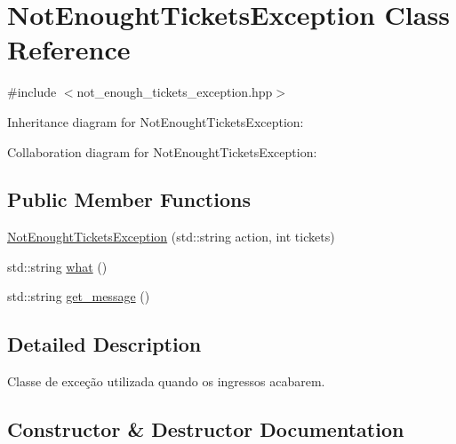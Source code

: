 \hypertarget{class_not_enought_tickets_exception}{}\section{Not\+Enought\+Tickets\+Exception Class Reference}
\label{class_not_enought_tickets_exception}


{\ttfamily \#include $<$not\+\_\+enough\+\_\+tickets\+\_\+exception.\+hpp$>$}



Inheritance diagram for Not\+Enought\+Tickets\+Exception\+:


Collaboration diagram for Not\+Enought\+Tickets\+Exception\+:
\subsection*{Public Member Functions}
\begin{DoxyCompactItemize}
\item 
\hyperlink{class_not_enought_tickets_exception_ada7cbb87669892356700e0f7da1a7745}{Not\+Enought\+Tickets\+Exception} (std\+::string action, int tickets)
\item 
std\+::string \hyperlink{class_not_enought_tickets_exception_a5d183eb42cfc1a119c3e33b1e697dc47}{what} ()
\item 
std\+::string \hyperlink{class_not_enought_tickets_exception_a12a085992a667c8859b9f3cc86e44664}{get\+\_\+message} ()
\end{DoxyCompactItemize}


\subsection{Detailed Description}
Classe de exceção utilizada quando os ingressos acabarem. 

\subsection{Constructor \& Destructor Documentation}
\mbox{\label{class_not_enought_tickets_exception_ada7cbb87669892356700e0f7da1a7745}} 

